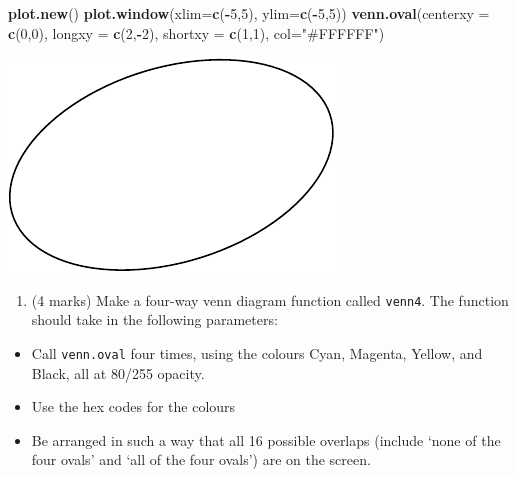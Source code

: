 \documentclass[
]{article}
\newenvironment{Shaded}{\begin{snugshade}}{\end{snugshade}}
\newcommand{\AttributeTok}[1]{\textcolor[rgb]{0.13,0.29,0.53}{#1}}
\newcommand{\DecValTok}[1]{\textcolor[rgb]{0.00,0.00,0.81}{#1}}
\newcommand{\FunctionTok}[1]{\textcolor[rgb]{0.13,0.29,0.53}{\textbf{#1}}}
\newcommand{\NormalTok}[1]{#1}
\newcommand{\SpecialCharTok}[1]{\textcolor[rgb]{0.81,0.36,0.00}{\textbf{#1}}}
\newcommand{\StringTok}[1]{\textcolor[rgb]{0.31,0.60,0.02}{#1}}
\providecommand{\tightlist}{%
  \setlength{\itemsep}{0pt}\setlength{\parskip}{0pt}}
\begin{document}
\begin{Shaded}
\begin{Highlighting}[]
\FunctionTok{plot.new}\NormalTok{()}
\FunctionTok{plot.window}\NormalTok{(}\AttributeTok{xlim=}\FunctionTok{c}\NormalTok{(}\SpecialCharTok{{-}}\DecValTok{5}\NormalTok{,}\DecValTok{5}\NormalTok{), }\AttributeTok{ylim=}\FunctionTok{c}\NormalTok{(}\SpecialCharTok{{-}}\DecValTok{5}\NormalTok{,}\DecValTok{5}\NormalTok{))}
\FunctionTok{venn.oval}\NormalTok{(}\AttributeTok{centerxy =} \FunctionTok{c}\NormalTok{(}\DecValTok{0}\NormalTok{,}\DecValTok{0}\NormalTok{), }\AttributeTok{longxy =} \FunctionTok{c}\NormalTok{(}\DecValTok{2}\NormalTok{,}\SpecialCharTok{{-}}\DecValTok{2}\NormalTok{), }
                 \AttributeTok{shortxy =} \FunctionTok{c}\NormalTok{(}\DecValTok{1}\NormalTok{,}\DecValTok{1}\NormalTok{), }\AttributeTok{col=}\StringTok{"\#FFFFFF"}\NormalTok{)}
\end{Highlighting}
\end{Shaded}

\includegraphics{Assignment1_Rcode_files/figure-latex/unnamed-chunk-5-1.pdf}

\begin{enumerate}
\def\labelenumi{\alph{enumi})}
\setcounter{enumi}{1}
\tightlist
\item
  (4 marks) Make a four-way venn diagram function called \texttt{venn4}.
  The function should take in the following parameters:
\end{enumerate}

\begin{itemize}
\tightlist
\item
  Call \texttt{venn.oval} four times, using the colours Cyan, Magenta,
  Yellow, and Black, all at 80/255 opacity.
\item
  Use the hex codes for the colours
\item
  Be arranged in such a way that all 16 possible overlaps (include `none
  of the four ovals' and `all of the four ovals') are on the screen.
\end{itemize}
\end{document}
